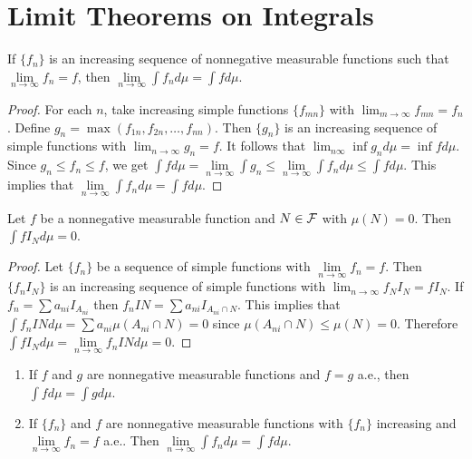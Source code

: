 \chapter{Limit Theorems on Integrals}

\begin{theorem}
If $\{f_n\}$ is an increasing sequence of nonnegative measurable functions such that 
$\lim\limits_{n\to\infty} f_n=f$, then $\lim\limits_{n\to\infty}\int f_nd\mu = \int fd\mu$.
\end{theorem}

\begin{proof}
For each $n$, take increasing simple functions $\{f_{mn}\}$ with $\lim_{m\to\infty}f_{mn}=f_n$. Define $g_n=\max(f_{1n}, f_{2n}, \ldots,f_{nn})$. Then 
$\{g_n\}$ is an increasing sequence of simple functions with $\lim_{n\to\infty}g_n=f$. 
It follows that $\lim_{n\infty}\inf g_nd\mu=\inf fd\mu$. Since $g_n\leq f_n\leq f$, we get $\int fd\mu=\lim\limits_{n\to\infty}\int g_n\leq \lim\limits_{n\to\infty}\int f_nd\mu\leq \int fd\mu$. This implies that $\lim\limits_{n\to\infty}\int f_nd\mu=\int fd\mu$.
\end{proof}



\begin{lemma}
Let $f$ be a nonnegative measurable function and $N\in \mathcal F$ with $\mu(N)=0$. Then $\int fI_Nd\mu=0$.
\end{lemma}

\begin{proof}
Let $\{f_n\}$ be a sequence of simple functions with $\lim\limits_{n\to\infty}f_n=f$. Then $\{f_n I_N\}$ is an increasing sequence of simple functions with $\lim_{n\to\infty}f_NI_N=fI_N$. If $f_n=\sum a_{ni}I_{A_{ni}}$
then $f_nIN=\sum a_{ni}I_{A_{ni}\cap N}$. This implies that $\int f_nINd\mu=\sum a_{ni}\mu(A_{ni}\cap N)=0$ since $\mu(A_{ni}\cap N)\leq \mu(N)=0$. Therefore $\int fI_Nd\mu=\lim\limits_{n\to\infty}f_nINd\mu=0$.
\end{proof}



\begin{theorem}
\begin{enumerate}
\item If $f$ and $g$ are nonnegative measurable functions and $f=g$ a.e., then $\int fd\mu=\int gd\mu$.
\item If $\{f_n\}$ and $f$ are nonnegative measurable functions with $\{f_n\}$ increasing and $\lim\limits_{n\to\infty}f_n=f$ a.e.. Then $\lim\limits_{n\to\infty}\int f_nd\mu=\int fd\mu$.
\end{enumerate}
\end{theorem}



